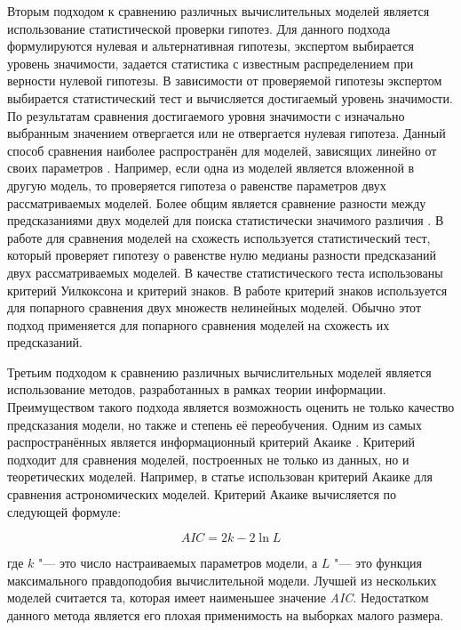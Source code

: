 Вторым подходом к сравнению различных вычислительных моделей является использование статистической проверки гипотез. 
Для данного подхода формулируются нулевая и альтернативная гипотезы, экспертом выбирается уровень значимости, задается 
статистика с известным распределением при верности нулевой гипотезы. В зависимости от проверяемой гипотезы экспертом 
выбирается статистический тест и вычисляется достигаемый уровень значимости. По результатам сравнения достигаемого 
уровня значимости с изначально выбранным значением отвергается или не отвергается нулевая гипотеза. Данный способ 
сравнения наиболее распространён для моделей, зависящих линейно от своих параметров \cite{pham2007system}. Например, 
если одна из моделей является вложенной в другую модель, то проверяется гипотеза о равенстве параметров двух 
рассматриваемых моделей. Более общим является сравнение разности между предсказаниями двух моделей для поиска 
статистически значимого различия \cite{rencher2008linear}. В работе \cite{mahmoudi2018testing} для сравнения моделей 
на схожесть используется статистический тест, который проверяет гипотезу о равенстве нулю медианы разности предсказаний 
двух рассматриваемых моделей. В качестве статистического теста использованы критерий Уилкоксона и критерий знаков. 
В работе \cite{tirikov2021methods} критерий знаков используется для попарного сравнения двух множеств нелинейных моделей. 
Обычно этот подход применяется для попарного сравнения моделей на схожесть их предсказаний.

Третьим подходом к сравнению различных вычислительных моделей является использование методов, разработанных в рамках 
теории информации. Преимуществом такого подхода является возможность оценить не только качество предсказания модели, 
но также и степень её переобучения. Одним из самых распространённых является информационный критерий Акаике 
\cite{akaike1974new}. Критерий подходит для сравнения моделей, построенных не только из данных, но и теоретических 
моделей. Например, в статье \cite{liddle2007information} использован критерий Акаике для сравнения астрономических 
моделей. Критерий Акаике вычисляется по следующей формуле:



\begin{equation}
AIC=2k-2\ln L
\end{equation}

где $k$ "--- это число настраиваемых параметров модели, а $L$ "--- это функция максимального правдоподобия вычислительной 
модели. Лучшей из нескольких моделей считается та, которая имеет наименьшее значение \textit{AIC}. Недостатком данного 
метода является его плохая применимость на выборках малого размера. 

